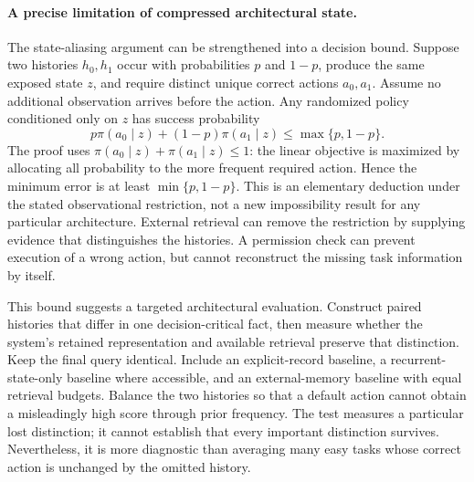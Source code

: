 \paragraph{A precise limitation of compressed architectural state.}
The state-aliasing argument can be strengthened into a decision bound. Suppose two histories $h_0,h_1$ occur with probabilities $p$ and $1-p$, produce the same exposed state $z$, and require distinct unique correct actions $a_0,a_1$. Assume no additional observation arrives before the action. Any randomized policy conditioned only on $z$ has success probability
\begin{equation}
 p\pi(a_0\mid z)+(1-p)\pi(a_1\mid z)
 \leq \max\{p,1-p\}.
\end{equation}
The proof uses $\pi(a_0\mid z)+\pi(a_1\mid z)\leq1$: the linear objective is maximized by allocating all probability to the more frequent required action. Hence the minimum error is at least $\min\{p,1-p\}$. This is an elementary deduction under the stated observational restriction, not a new impossibility result for any particular architecture. External retrieval can remove the restriction by supplying evidence that distinguishes the histories. A permission check can prevent execution of a wrong action, but cannot reconstruct the missing task information by itself.

This bound suggests a targeted architectural evaluation. Construct paired histories that differ in one decision-critical fact, then measure whether the system's retained representation and available retrieval preserve that distinction. Keep the final query identical. Include an explicit-record baseline, a recurrent-state-only baseline where accessible, and an external-memory baseline with equal retrieval budgets. Balance the two histories so that a default action cannot obtain a misleadingly high score through prior frequency. The test measures a particular lost distinction; it cannot establish that every important distinction survives. Nevertheless, it is more diagnostic than averaging many easy tasks whose correct action is unchanged by the omitted history.
